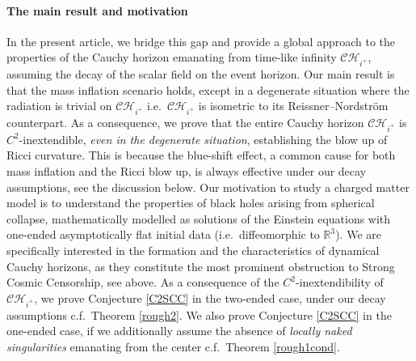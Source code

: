 \documentclass[10pt,a4paper]{article}
\theoremstyle{plain}
\theoremstyle{remark}
\theoremstyle{definition}
\newcommand{\RR}{\mathbb{R}}
\theoremstyle{plain}
\theoremstyle{remark}
\theoremstyle{definition}
\newcommand{\CH}{\mathcal{CH}_{i^+}}
\numberwithin{equation}{section}
\begin{document}
 	
 	\paragraph{The main result and motivation} In the present article, we bridge this gap and provide a global approach to the properties of the Cauchy horizon emanating from time-like infinity $\CH$, assuming the decay of the scalar field on the event horizon. Our main result is that the mass inflation scenario holds, except in a degenerate situation where the radiation is trivial on $\CH$ i.e.\ $\CH$ is isometric to its Reissner--Nordstr\"{o}m counterpart. As a consequence, we prove that the entire Cauchy horizon $\CH$ is $C^2$-inextendible, \textit{even in the degenerate situation}, establishing the blow up of Ricci curvature. This is because the blue-shift effect, a common cause for both mass inflation and the Ricci blow up, is always effective under our decay assumptions, see the discussion below. Our motivation to study a charged matter model is to understand the properties of black holes arising from spherical collapse, mathematically modelled as solutions of the Einstein equations with one-ended asymptotically flat initial data (i.e.\ diffeomorphic to $\RR^3$). We are specifically interested in the formation and the characteristics of dynamical Cauchy horizons, as they constitute the most prominent obstruction to Strong Cosmic Censorship, see above. As a consequence of the $C^2$-inextendibility of $\CH$, we prove Conjecture \ref{C2SCC}  in the two-ended case, under our decay assumptions c.f.\ Theorem \ref{rough2}. We also prove Conjecture \ref{C2SCC} in the one-ended case, if we additionally assume the absence of \textit{locally naked singularities} emanating from the center c.f.\ Theorem \ref{rough1cond}.
 	
 	
 	
\end{document}
